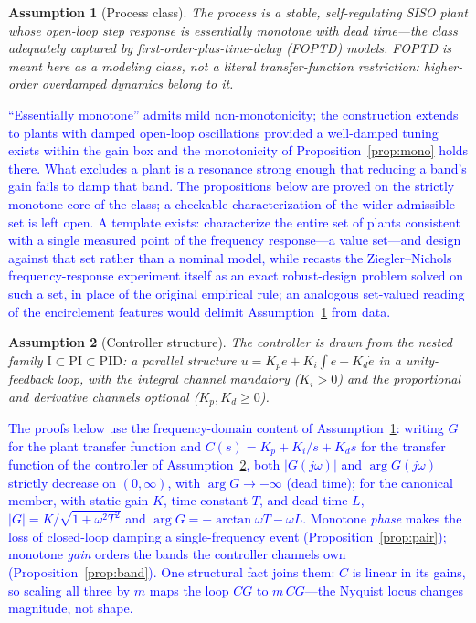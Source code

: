 \documentclass[final,3p,times,twocolumn]{elsarticle}
\newcommand{\revc}[1]{\textcolor{blue}{#1}} %
\newcommand{\reve}[1]{\textcolor{blue}{#1}} %
\newcommand{\revf}[1]{\textcolor{blue}{#1}} %
\newtheorem{assumption}{Assumption}
\begin{document}
\begin{assumption}[Process class]\label{ass:plant}
The process is a stable, self-regulating SISO plant whose open-loop step
response is essentially monotone with dead time---the class adequately
captured by first-order-plus-time-delay (FOPTD) models. FOPTD is meant
here as a modeling class, not a literal transfer-function restriction:
higher-order overdamped dynamics belong to it.
\end{assumption}

\revc{``Essentially monotone'' admits mild non-monotonicity; the
construction extends to plants with damped open-loop oscillations
provided a well-damped tuning exists within the gain box and the
monotonicity of Proposition~\ref{prop:mono} holds there. What excludes
a plant is a resonance strong enough that reducing a band's gain fails
to damp that band. The propositions below are proved on the strictly
monotone core of the class; a checkable characterization of the wider
admissible set is left open. \revf{A template exists: \cite{SchlegelCech2005}
characterize the entire set of plants consistent with a single measured
point of the frequency response---a value set---and design against
that set rather than a nominal model, while \cite{Schlegel2002} recasts
the Ziegler--Nichols frequency-response experiment itself as an exact
robust-design problem solved on such a set, in place of the original
empirical rule; an analogous set-valued reading of the encirclement
features would delimit Assumption~\ref{ass:plant} from data.}}

\begin{assumption}[Controller structure]\label{ass:pid}
The controller is drawn from the nested family
$\mathrm{I} \subset \mathrm{PI} \subset \mathrm{PID}$: a parallel
structure $u = K_p e + K_i\!\int\! e + K_d \dot e$ in a unity-feedback
loop, with the integral channel mandatory ($K_i > 0$) and the
proportional and derivative channels optional ($K_p, K_d \ge 0$).
\end{assumption}

\reve{The proofs below use the frequency-domain content of
Assumption~\ref{ass:plant}: writing $G$ for the plant transfer
function and $C(s) = K_p + K_i/s + K_d s$ for the transfer function of
the controller of Assumption~\ref{ass:pid}, both $|G(j\omega)|$ and
$\arg G(j\omega)$ strictly decrease on $(0,\infty)$, with $\arg G \to -\infty$ (dead time); for the canonical
member, with static gain $K$, time constant $T$, and dead time $L$,
$|G| = K/\sqrt{1+\omega^2T^2}$ and
$\arg G = -\arctan\omega T - \omega L$. Monotone \emph{phase} makes
the loss of closed-loop damping a single-frequency event
(Proposition~\ref{prop:pair}); monotone \emph{gain} orders the bands
the controller channels own (Proposition~\ref{prop:band}). One
structural fact joins them: $C$ is linear in its gains, so scaling all
three by $m$ maps the loop $CG$ to $m\,CG$---the Nyquist locus changes
magnitude, not shape.}
\end{document}
